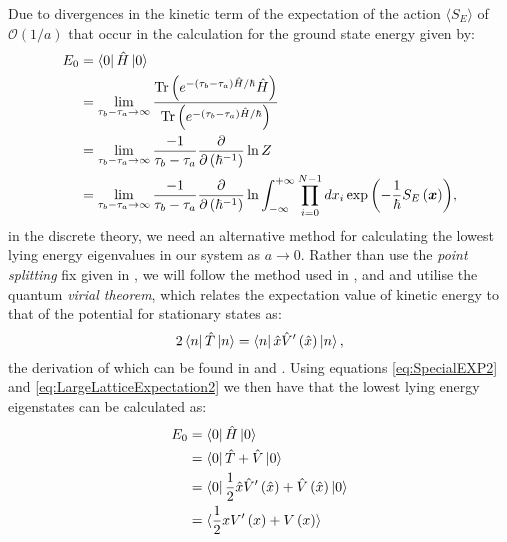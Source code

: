 \documentclass[12pt]{article}
\begin{document}
        Due to divergences in the kinetic term of the expectation of the action $\langle S_{E} \rangle$ of $\mathcal{O}\left(1/a\right) $\cite{creutz_freedman_1981} that occur in the calculation for the ground state energy given by:
        \begin{align}
            E_{0} & = \bra{0}\hat{H}\ket{0} \\
                  & = \lim_{\tau_b-\tau_a \rightarrow \infty} \frac{\text{Tr}\left(e^{-\left(\tau_b-\tau_a\right)\hat{H}/\hbar}\hat{H}\right)}{\text{Tr}\left(e^{-\left(\tau_b-\tau_a\right)\hat{H}/\hbar}\right)} \\
                  & = \lim_{\tau_b-\tau_a \rightarrow \infty} \frac{-1}{\tau_b-\tau_a} \frac{\partial}{\partial\left(\hbar^{-1}\right)}\ln{Z} \\
                  & = \lim_{\tau_b-\tau_a \rightarrow \infty} \frac{-1}{\tau_b-\tau_a} \frac{\partial}{\partial\left(\hbar^{-1}\right)}\ln \int^{+\infty}_{-\infty}\prod_{i=0}^{N-1}dx_i \exp{\left(-\frac{1}{\hbar}S_{E}\left(\bm{x}\right)\right)},
        \end{align}
        in the discrete theory, we need an alternative method for calculating the lowest lying energy eigenvalues in our system as $a\rightarrow 0$. Rather than use the \textit{point splitting} fix given in \cite{feynman_hibbs_1965}, we will follow the method used in \cite{creutz_freedman_1981}, \cite{rodgers_raes} and \cite{slapik_serenone} and utilise the quantum \textit{virial theorem}, which relates the expectation value of kinetic energy to that of the potential for stationary states as:
        \begin{equation}
            \label{eq:VirialTheorem}
            2\bra{n} \hat{T} \ket{n} = \bra{n} \hat{x} \hat{V}'\left(\hat{x}\right) \ket{n},
        \end{equation}
         the derivation of which can be found in \cite{binney_skinner_2015} and \cite{fock_1930}. Using equations \ref{eq:SpecialEXP2} and \ref{eq:LargeLatticeExpectation2} we then have that the lowest lying energy eigenstates can be calculated as:
         \begin{align}
            E_0  & = \bra{0}\hat{H}\ket{0} \\
                 & = \bra{0}\hat{T}+\hat{V}\ket{0}\\
                 & = \bra{0}\frac{1}{2}\hat{x}\hat{V}'\left(\hat{x}\right)+\hat{V}\left(\hat{x}\right)\ket{0}\\
                 & = \langle \frac{1}{2}xV'\left(x\right) +  V\left(x\right) \rangle
         \end{align}
\end{document}
